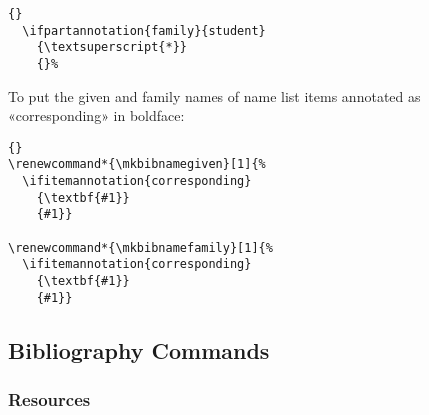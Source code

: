 \documentclass{ltxdockit}[2011/03/25]
\begin{document}
\begin{lstlisting}[style=latex]{}
  \ifpartannotation{family}{student}
    {\textsuperscript{*}}
    {}%
\end{lstlisting}
%
To put the given and family names of name list items annotated as «corresponding» in boldface:

\begin{lstlisting}[style=latex]{}
\renewcommand*{\mkbibnamegiven}[1]{%
  \ifitemannotation{corresponding}
    {\textbf{#1}}
    {#1}}

\renewcommand*{\mkbibnamefamily}[1]{%
  \ifitemannotation{corresponding}
    {\textbf{#1}}
    {#1}}
\end{lstlisting}

\subsection{Bibliography Commands}
\label{use:bib}

\subsubsection{Resources}
\label{use:bib:res}
\end{document}

